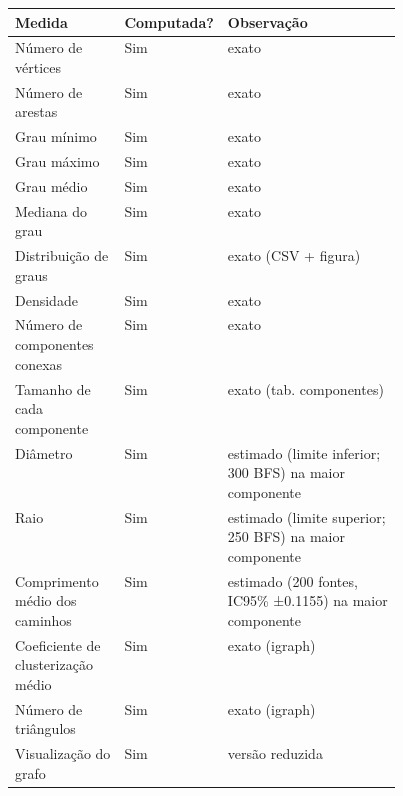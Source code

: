 \begin{tabular}{llp{0.45\linewidth}}
    \toprule
    Medida & Computada? & Observação \\
    \midrule
    Número de vértices & Sim & exato \\
    Número de arestas & Sim & exato \\
    Grau mínimo & Sim & exato \\
    Grau máximo & Sim & exato \\
    Grau médio & Sim & exato \\
    Mediana do grau & Sim & exato \\
    Distribuição de graus & Sim & exato (CSV + figura) \\
    Densidade & Sim & exato \\
    Número de componentes conexas & Sim & exato \\
    Tamanho de cada componente & Sim & exato (tab. componentes) \\
    Diâmetro & Sim & estimado (limite inferior; 300 BFS) na maior componente \\
    Raio & Sim & estimado (limite superior; 250 BFS) na maior componente \\
    Comprimento médio dos caminhos & Sim & estimado (200 fontes, IC95\% ±0.1155) na maior componente \\
    Coeficiente de clusterização médio & Sim & exato (igraph) \\
    Número de triângulos & Sim & exato (igraph) \\
    Visualização do grafo & Sim & versão reduzida \\
    \bottomrule
\end{tabular}
